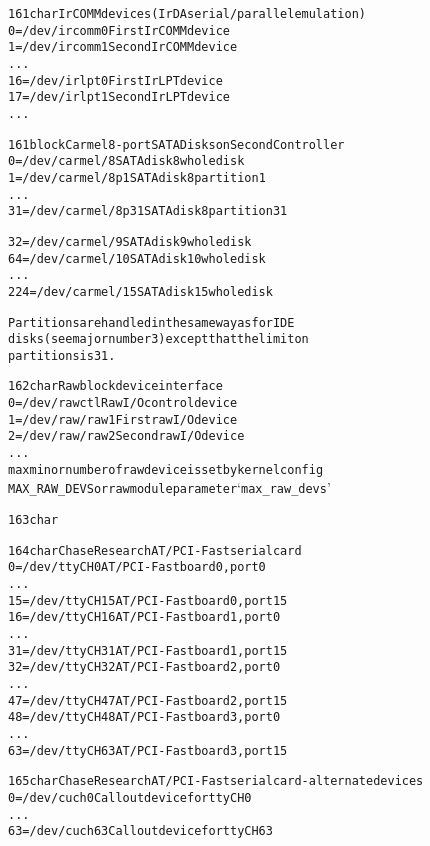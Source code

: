 \documentclass[a4paper,8pt,english]{sphinxmanual}
\begin{document}
\begin{alltt}
 161 char       IrCOMM devices (IrDA serial/parallel emulation)
                  0 = /dev/ircomm0      First IrCOMM device
                  1 = /dev/ircomm1      Second IrCOMM device
                    ...
                 16 = /dev/irlpt0       First IrLPT device
                 17 = /dev/irlpt1       Second IrLPT device
                    ...

 161 block       Carmel 8-port SATA Disks on Second Controller
                  0 = /dev/carmel/8     SATA disk 8 whole disk
                  1 = /dev/carmel/8p1   SATA disk 8 partition 1
                    ...
                 31 = /dev/carmel/8p31  SATA disk 8 partition 31

                 32 = /dev/carmel/9     SATA disk 9 whole disk
                 64 = /dev/carmel/10    SATA disk 10 whole disk
                    ...
                224 = /dev/carmel/15    SATA disk 15 whole disk

                Partitions are handled in the same way as for IDE
                disks (see major number 3) except that the limit on
                partitions is 31.

 162 char       Raw block device interface
                  0 = /dev/rawctl       Raw I/O control device
                  1 = /dev/raw/raw1     First raw I/O device
                  2 = /dev/raw/raw2     Second raw I/O device
                    ...
                 max minor number of raw device is set by kernel config
                 MAX\_RAW\_DEVS or raw module parameter `max\_raw\_devs'

 163 char

 164 char       Chase Research AT/PCI-Fast serial card
                  0 = /dev/ttyCH0       AT/PCI-Fast board 0, port 0
                    ...
                 15 = /dev/ttyCH15      AT/PCI-Fast board 0, port 15
                 16 = /dev/ttyCH16      AT/PCI-Fast board 1, port 0
                    ...
                 31 = /dev/ttyCH31      AT/PCI-Fast board 1, port 15
                 32 = /dev/ttyCH32      AT/PCI-Fast board 2, port 0
                    ...
                 47 = /dev/ttyCH47      AT/PCI-Fast board 2, port 15
                 48 = /dev/ttyCH48      AT/PCI-Fast board 3, port 0
                    ...
                 63 = /dev/ttyCH63      AT/PCI-Fast board 3, port 15

 165 char       Chase Research AT/PCI-Fast serial card - alternate devices
                  0 = /dev/cuch0        Callout device for ttyCH0
                    ...
                 63 = /dev/cuch63       Callout device for ttyCH63


\end{alltt}
\end{document}
